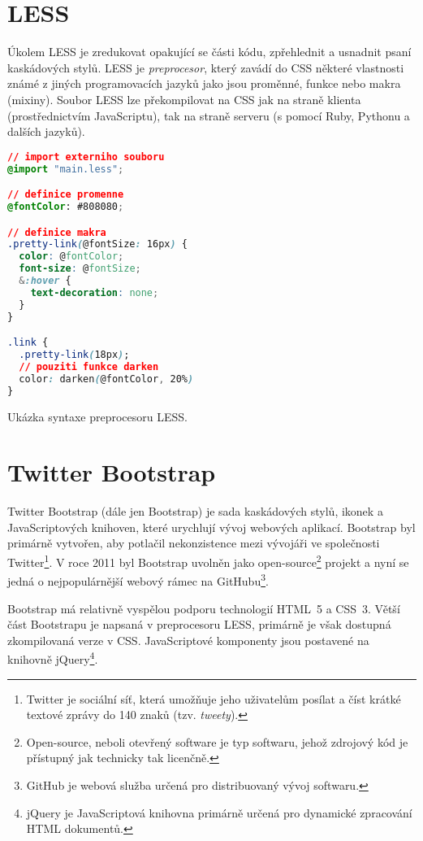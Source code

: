 \section{LESS}
\label{sec:less}

Úkolem LESS je zredukovat opakující se části kódu, zpřehlednit a usnadnit psaní kaskádových stylů. LESS je \textit{preprocesor}, který zavádí do CSS některé vlastnosti známé z jiných programovacích jazyků jako jsou proměnné, funkce nebo makra (mixiny). Soubor LESS lze překompilovat na CSS jak na straně klienta (prostřednictvím JavaScriptu), tak na straně serveru (s pomocí Ruby, Pythonu a dalších jazyků). \cite{18}

\begin{example}
    \centering
    \begin{lstlisting}[language=css]
// import externiho souboru
@import "main.less";

// definice promenne
@fontColor: #808080;

// definice makra
.pretty-link(@fontSize: 16px) {
  color: @fontColor;
  font-size: @fontSize;
  &:hover {
    text-decoration: none;
  }
}

.link {
  .pretty-link(18px);
  // pouziti funkce darken
  color: darken(@fontColor, 20%)
}
    \end{lstlisting}
    \caption{Ukázka syntaxe preprocesoru LESS.}
    \label{example:less-css}
\end{example}

\section{Twitter Bootstrap}
\label{sec:bootstrap}

Twitter Bootstrap (dále jen Bootstrap) je sada kaskádových stylů, ikonek a JavaScriptových knihoven, které urychlují vývoj webových aplikací. Bootstrap byl primárně vytvořen, aby potlačil nekonzistence mezi vývojáři ve společnosti Twitter\footnote{Twitter je sociální síť, která umožňuje jeho uživatelům posílat a číst krátké textové zprávy do 140 znaků (tzv. \textit{tweety}).}. V roce 2011 byl Bootstrap uvolněn jako open-source\footnote{Open-source, neboli otevřený software je typ softwaru, jehož zdrojový kód je přístupný jak technicky tak licenčně.} projekt a nyní se jedná o nejpopulárnější webový rámec na GitHubu\footnote{GitHub je webová služba určená pro distribuovaný vývoj softwaru.}. \cite{19}

Bootstrap má relativně vyspělou podporu technologií HTML~5 a CSS~3. Větší část Bootstrapu je napsaná v preprocesoru LESS, primárně je však dostupná zkompilovaná verze v CSS. JavaScriptové komponenty jsou postavené na knihovně jQuery\footnote{jQuery je JavaScriptová knihovna primárně určená pro dynamické zpracování HTML dokumentů.}.

